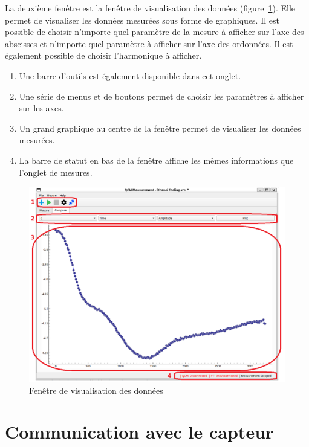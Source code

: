 La deuxième fenêtre est la fenêtre de visualisation des données (figure~\ref{fig:plot window}).  
Elle permet de visualiser les données mesurées sous forme de graphiques.  
Il est possible de choisir n'importe quel paramètre de la mesure à afficher sur l'axe des abscisses et n'importe quel paramètre à afficher sur l'axe des ordonnées.  
Il est également possible de choisir l'harmonique à afficher.

\begin{enumerate}
    \item Une barre d'outils est également disponible dans cet onglet.
    \item Une série de menus et de boutons permet de choisir les paramètres à afficher sur les axes.
    \item Un grand graphique au centre de la fenêtre permet de visualiser les données mesurées.
    \item La barre de statut en bas de la fenêtre affiche les mêmes informations que l'onglet de mesures.
\end{enumerate}

\begin{figure}[H]
    \centering
    \includegraphics[width=\textwidth]{assets/figures/Plot_window_.png}
    \caption{Fenêtre de visualisation des données}
    \label{fig:plot window}
\end{figure}

\section{Communication avec le capteur}

